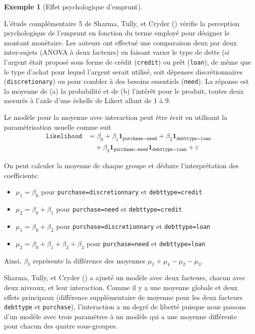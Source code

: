 \documentclass[
  11pt,
  letterpaper,
]{scrbook}
\providecommand{\tightlist}{%
  \setlength{\itemsep}{0pt}\setlength{\parskip}{0pt}}\usepackage{longtable,booktabs,array}
\theoremstyle{plain}
\theoremstyle{plain}
\theoremstyle{definition}
\newtheorem{example}{Exemple}[chapter]
\theoremstyle{definition}
\theoremstyle{remark}
\begin{document}
\begin{example}[Effet psychologique
d'emprunt]\protect\hypertarget{exm-STC21-twoway}{}\label{exm-STC21-twoway}

L'étude complémentaire 5 de Sharma, Tully, et Cryder
() vérifie la perception
psychologique de l'emprunt en fonction du terme employé pour désigner le
montant monétaire. Les auteurs ont effectué une comparaison deux par
deux inter-sujets (ANOVA à deux facteurs) en faisant varier le type de
dette (si l'argent était proposé sous forme de crédit (\texttt{credit})
ou prêt (\texttt{loan}), de même que le type d'achat pour lequel
l'argent serait utilisé, soit dépenses discrétionnaires
(\texttt{discretionary}) ou pour combler à des besoins essentiels
(\texttt{need}). La réponse est la moyenne de (a) la probabilité et de
(b) l'intérêt pour le produit, toutes deux mesurés à l'aide d'une
échelle de Likert allant de 1 à 9.

Le modèle pour la moyenne avec interaction peut être écrit en utilisant
la paramétrisation usuelle comme suit \begin{align*}
\texttt{likelihood} &= \beta_0 + \beta_1\mathbf{1}_{\texttt{purchase=need}} + \beta_2\mathbf{1}_{\texttt{debttype=loan}} \\&\quad+ \beta_3\mathbf{1}_{\texttt{purchase=need}}\mathbf{1}_{\texttt{debttype=loan}} + \varepsilon
\end{align*}

On peut calculer la moyenne de chaque groupe et déduire l'interprétation
des coefficients:

\begin{itemize}
\tightlist
\item
  \(\mu_1 = \beta_0\) pour \texttt{purchase=discretionnary} et
  \texttt{debttype=credit}
\item
  \(\mu_2 = \beta_0 + \beta_1\) pour \texttt{purchase=need} et
  \texttt{debttype=credit}
\item
  \(\mu_1 = \beta_0 + \beta_2\) pour \texttt{purchase=discretionnary} et
  \texttt{debttype=loan}
\item
  \(\mu_2 = \beta_0 + \beta_1 + \beta_2 + \beta_3\) pour
  \texttt{purchase=need} et \texttt{debttype=loan}
\end{itemize}

Ainsi, \(\beta_3\) représente la différence des moyennes
\(\mu_1 + \mu_4 - \mu_2 - \mu_3.\)

Sharma, Tully, et Cryder ()
a ajusté un modèle avec deux facteurs, chacun avec deux niveaux, et leur
interaction. Comme il y a une moyenne globale et deux effets principaux
(différence supplémentaire de moyenne pour les deux facteurs
\texttt{debttype} et \texttt{purchase}), l'interaction a un degré de
liberté puisque nous passons d'un modèle avec trois paramètres à un
modèle qui a une moyenne différente pour chacun des quatre sous-groupes.


\end{example}
\end{document}
